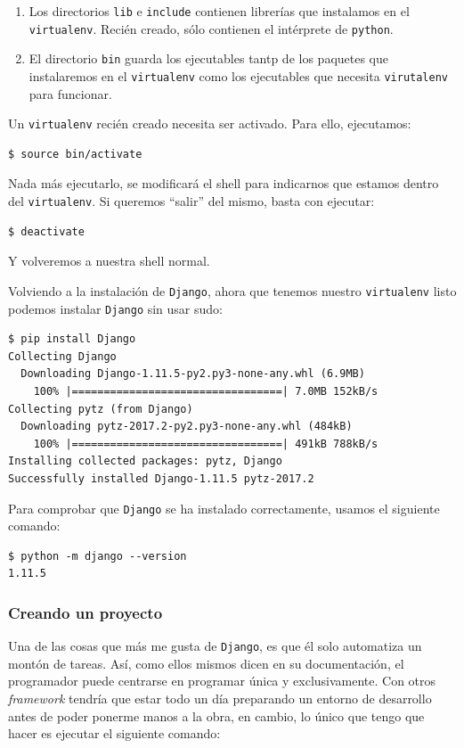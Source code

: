 \begin{enumerate}[---]
\item Los directorios \texttt{lib} e \texttt{include} contienen librerías que instalamos en el \texttt{virtualenv}. Recién creado, sólo contienen el intérprete de \texttt{python}.
\item El directorio \texttt{bin} guarda los ejecutables tantp de los paquetes que instalaremos en el \texttt{virtualenv} como los ejecutables que necesita \texttt{virutalenv} para funcionar.
\end{enumerate}

Un \texttt{virtualenv} recién creado necesita ser activado. Para ello, ejecutamos:

\begin{verbatim}
$ source bin/activate
\end{verbatim}

Nada más ejecutarlo, se modificará el shell para indicarnos que estamos dentro del \texttt{virtualenv}. Si queremos ``salir'' del mismo, basta con ejecutar:

\begin{verbatim}
$ deactivate
\end{verbatim}

Y volveremos a nuestra shell normal.

Volviendo a la instalación de \texttt{Django}, ahora que tenemos nuestro \texttt{virtualenv} listo podemos instalar \texttt{Django} sin usar sudo:

\begin{verbatim}
$ pip install Django
Collecting Django
  Downloading Django-1.11.5-py2.py3-none-any.whl (6.9MB)
    100% |=================================| 7.0MB 152kB/s 
Collecting pytz (from Django)
  Downloading pytz-2017.2-py2.py3-none-any.whl (484kB)
    100% |=================================| 491kB 788kB/s 
Installing collected packages: pytz, Django
Successfully installed Django-1.11.5 pytz-2017.2
\end{verbatim}

Para comprobar que \texttt{Django} se ha instalado correctamente, usamos el siguiente comando:

\begin{verbatim}
$ python -m django --version
1.11.5
\end{verbatim}

\subsubsection{Creando un proyecto}
Una de las cosas que más me gusta de \texttt{Django}, es que él solo automatiza un montón de tareas. Así, como ellos mismos dicen en su documentación, el programador puede centrarse en programar única y exclusivamente. Con otros \textit{framework} tendría que estar todo un día preparando un entorno de desarrollo antes de poder ponerme manos a la obra, en cambio, lo único que tengo que hacer es ejecutar el siguiente comando:

